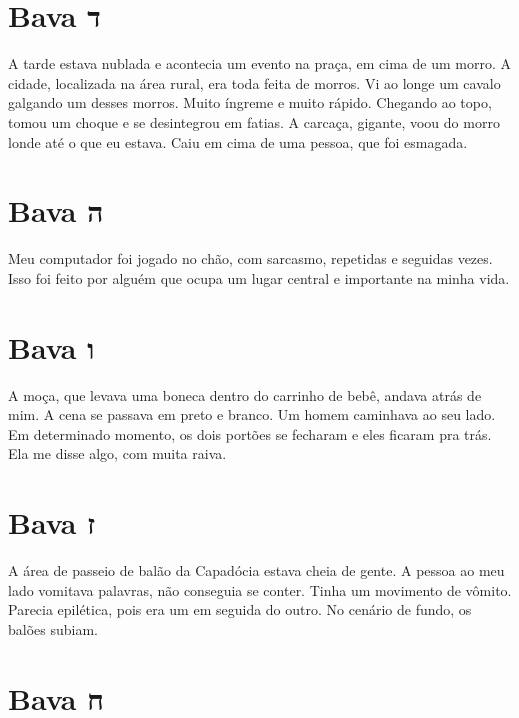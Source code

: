 \chapter*{Bava ד\smallskip{}}

A tarde estava nublada e acontecia um evento na praça, em cima de um morro. A cidade, localizada na área rural, era toda feita de morros. Vi ao longe um cavalo galgando um desses morros. Muito íngreme e muito rápido. Chegando ao topo, tomou um choque e se desintegrou em fatias. A carcaça, gigante, voou do morro londe até o que eu estava. Caiu em cima de uma pessoa, que foi esmagada.

\chapter*{Bava ה\smallskip{}}

Meu computador foi jogado no chão, com sarcasmo, repetidas e seguidas vezes. Isso foi feito por alguém que ocupa um lugar central e importante na minha vida.

\chapter*{Bava ו\smallskip{}}

A moça, que levava uma boneca dentro do carrinho de bebê, andava atrás de mim. A cena se passava em preto e branco. Um homem caminhava ao seu lado. Em determinado momento, os dois portões se fecharam e eles ficaram pra trás. Ela me disse algo, com muita raiva.

\chapter*{Bava ז\smallskip{}}

A área de passeio de balão da Capadócia estava cheia de gente. A pessoa ao meu lado vomitava palavras, não conseguia se conter. Tinha um movimento de vômito. Parecia epilética, pois era um em seguida do outro. No cenário de fundo, os balões subiam.

\chapter*{Bava ח\smallskip{}}

